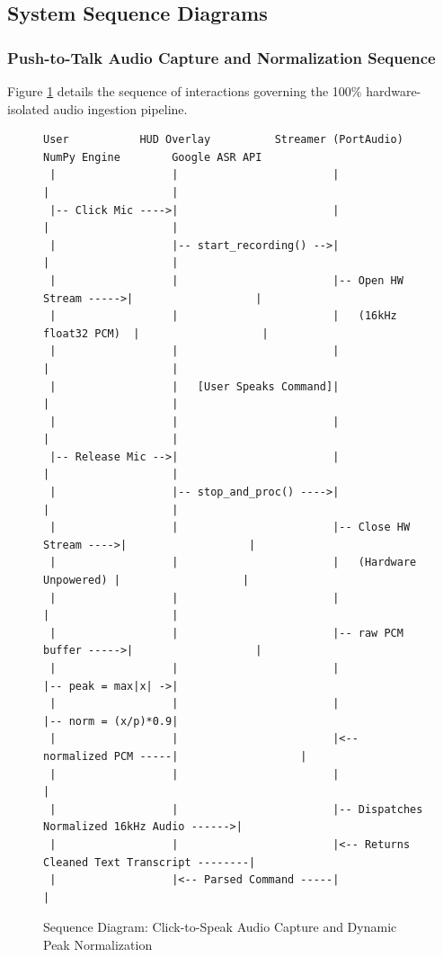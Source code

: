 \subsection{System Sequence Diagrams}

\subsubsection{Push-to-Talk Audio Capture and Normalization Sequence}
Figure \ref{fig:seq_audio_capture} details the sequence of interactions governing the 100\% hardware-isolated audio ingestion pipeline.

\begin{figure}[htbp]
\centering
{\scriptsize
\begin{verbatim}
User           HUD Overlay          Streamer (PortAudio)        NumPy Engine        Google ASR API
 |                  |                        |                        |                   |
 |-- Click Mic ---->|                        |                        |                   |
 |                  |-- start_recording() -->|                        |                   |
 |                  |                        |-- Open HW Stream ----->|                   |
 |                  |                        |   (16kHz float32 PCM)  |                   |
 |                  |                        |                        |                   |
 |                  |   [User Speaks Command]|                        |                   |
 |                  |                        |                        |                   |
 |-- Release Mic -->|                        |                        |                   |
 |                  |-- stop_and_proc() ---->|                        |                   |
 |                  |                        |-- Close HW Stream ---->|                   |
 |                  |                        |   (Hardware Unpowered) |                   |
 |                  |                        |                        |                   |
 |                  |                        |-- raw PCM buffer ----->|                   |
 |                  |                        |                        |-- peak = max|x| ->|
 |                  |                        |                        |-- norm = (x/p)*0.9|
 |                  |                        |<-- normalized PCM -----|                   |
 |                  |                        |                                            |
 |                  |                        |-- Dispatches Normalized 16kHz Audio ------>|
 |                  |                        |<-- Returns Cleaned Text Transcript --------|
 |                  |<-- Parsed Command -----|                                            |
\end{verbatim}
}
\caption{Sequence Diagram: Click-to-Speak Audio Capture and Dynamic Peak Normalization}
\label{fig:seq_audio_capture}
\end{figure}

